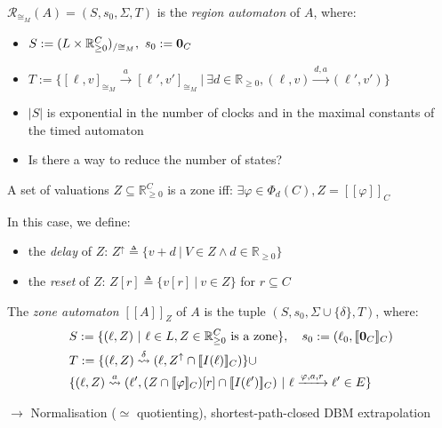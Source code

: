 \documentclass{beamer}
\theoremstyle{definition}
\newcommand{\xra}[1]{\overset{#1}{\rightsquigarrow}}
\begin{document}
\begin{frame}
\begin{definition}
  $\mathcal{R}_{\cong_M}(A) = (S, s_0, \Sigma, T)$ is the \emph{region automaton} of $A$, where:
  \begin{itemize}
    \item $S := (L \times \mathbb{R}_{\geq 0}^C)_{/\cong_M},\ s_0 := \text{\bf 0}_C$
    \item $T := \{[\ell, v]_{\cong_M} \xrightarrow{a} [\ell', v']_{\cong_M}\ |\ \exists d \in \mathbb{R}_{\geq 0}, (\ell, v) \xrightarrow{d, a} (\ell', v')\}$
  \end{itemize}
\end{definition}
\begin{itemize}
  \item<2> $\left| S \right|$ is exponential in the number of clocks and in the maximal constants of the timed automaton
  \item<2> Is there a way to reduce the number of states?
\end{itemize}
\end{frame}

\begin{frame}
  \small
  \begin{definition}[Zone]
    A set of valuations $Z \subseteq \mathbb{R}_{\geq 0}^C$ is a zone iff:
    $\exists \varphi \in \varPhi_d(C), Z = [\![\varphi]\!]_C$
    
    In this case, we define:
    \begin{itemize}
      \item the \emph{delay} of $Z$: $Z^\uparrow \triangleq \{ v + d \ |\ V \in Z \land d \in \mathbb{R}_{\geq 0}\}$
      \item the \emph{reset} of $Z$: $Z[r] \triangleq \{ v[r] \ |\ v \in Z\}$ for $r \subseteq C$
    \end{itemize}
  \end{definition}
  \small
  \begin{definition}
    The \emph{zone automaton} $[\![A]\!]_Z$ of $A$ is the tuple $(S, s_0, \Sigma \cup \{\delta\}, T)$, where:
    \begin{align*}
      &S := \{ (\ell, Z)\ |\ \ell \in L, Z \in \mathbb{R}_{\geq 0}^C\ \text{is a zone}\},\quad s_0 := (\ell_0, [\![\text{\bf 0}_C]\!]_C)\\
      &T := \{ (\ell, Z) \xra{\delta} (\ell, Z^\uparrow \cap [\![I(\ell)]\!]_C)\} \cup \\
      &\{ (\ell, Z) \xra{a} (\ell', (Z \cap [\![\varphi]\!]_C)[r] \cap [\![I(\ell')]\!]_C) \ |\ \ell \xrightarrow{\varphi, a, r} \ell' \in E\}
    \end{align*}
  \end{definition}
  $\rightarrow$ Normalisation ($\simeq$ quotienting), shortest-path-closed DBM extrapolation
\end{frame}
\end{document}
